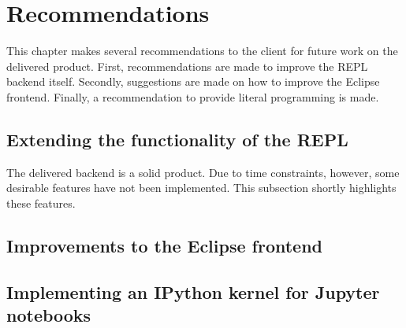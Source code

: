 \chapter{Recommendations}
\label{cha:recommendations}

This chapter makes several recommendations to the client for future work on the
delivered product. First, recommendations are made to improve the REPL backend
itself. Secondly, suggestions are made on how to improve the Eclipse frontend.
Finally, a recommendation to provide literal programming is made.

\section{Extending the functionality of the REPL}
\label{sec:impr-backend}

The delivered backend is a solid product. Due to time constraints, however, some
desirable features have not been implemented. This subsection shortly highlights
these features.





\section{Improvements to the Eclipse frontend}
\label{sec:impr-eclipse}



\section{Implementing an IPython kernel for Jupyter notebooks}
\label{sec:discuss-literate-programming}




